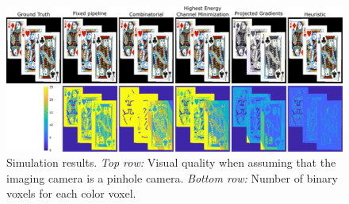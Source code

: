 \begin{figure}[h!]
\centering
\includegraphics[width=0.99\columnwidth]{images/volumetric/acd_exp1/exp_pinhole}
\caption[Adaptive color decomposition: pinhole-camera reconstruction and number of binary voxels]{Simulation results. \emph{Top row:} Visual quality when assuming that the imaging camera is a pinhole camera. \emph{Bottom row:} Number of binary voxels for each color voxel.}
\label{fig:volumetric:acd:exp1:pinhole}
\end{figure}

